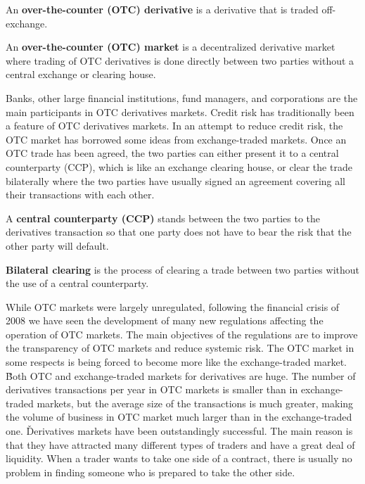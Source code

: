 An \textbf{over-the-counter (OTC) derivative} is a derivative that is traded off-exchange.
\ed

An \textbf{over-the-counter (OTC) market} is a decentralized derivative market where trading of OTC derivatives is done
directly between two parties without a central exchange or clearing house.
\ed

Banks, other large financial institutions, fund managers, and corporations are the main participants in OTC
derivatives markets. Credit risk has traditionally been a feature of OTC derivatives markets. In an attempt to
reduce credit risk, the OTC market has borrowed some ideas from exchange-traded markets. Once an OTC trade has been
agreed, the two parties can either present it to a central counterparty (CCP), which is like an exchange clearing
house, or clear the trade bilaterally where the two parties have usually signed an agreement covering all their
transactions with each other.

A \textbf{central counterparty (CCP)} stands between the two parties to the derivatives transaction so that one party
does not have to bear the risk that the other party will default.
\ed

\textbf{Bilateral clearing} is the process of clearing a trade between two parties without the use of a central
counterparty.
\ed

While OTC markets were largely unregulated, following the financial crisis of 2008 we have seen the development of
many new regulations affecting the operation of OTC markets. The main objectives of the regulations are to improve
the transparency of OTC markets and reduce systemic risk. The OTC market in some respects is being forced to become
more like the exchange-traded market. \v

Both OTC and exchange-traded markets for derivatives are huge. The number of derivatives transactions per year in OTC
markets is smaller than in exchange-traded markets, but the average size of the transactions is much greater, making
the volume of business in OTC market much larger than in the exchange-traded one. \v

Derivatives markets have been outstandingly successful. The main reason is that they have attracted many different
types of traders and have a great deal of liquidity. When a trader wants to take one side of a contract, there is
usually no problem in finding someone who is prepared to take the other side.


